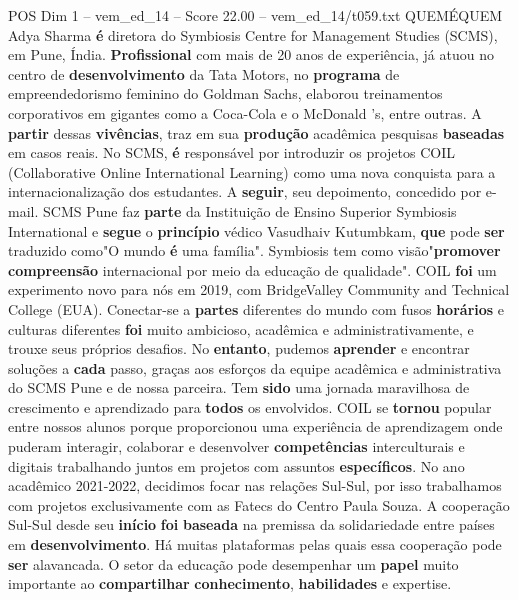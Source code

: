 \begin{textsample}{POS Dim 1 – vem\_ed\_14 – Score 22.00 – vem\_ed\_14/t059.txt}  \label{ex:f1_pos_152}
QUEMÉQUEM Adya Sharma \textbf{é} diretora do Symbiosis Centre for Management Studies (SCMS), em Pune, Índia. \textbf{Profissional} com mais de 20 anos de experiência, já atuou no centro de \textbf{desenvolvimento} da Tata Motors, no \textbf{programa} de empreendedorismo feminino do Goldman Sachs, elaborou treinamentos corporativos em gigantes como a Coca-Cola e o McDonald 's, entre outras.
A \textbf{partir} dessas \textbf{vivências}, traz em sua \textbf{produção} acadêmica pesquisas \textbf{baseadas} em casos reais.
No SCMS, \textbf{é} responsável por introduzir os projetos COIL (Collaborative Online International Learning) como uma nova conquista para a internacionalização dos estudantes.
A \textbf{seguir}, seu depoimento, concedido por e-mail.
SCMS Pune faz \textbf{parte} da Instituição de Ensino Superior Symbiosis International e \textbf{segue} o \textbf{princípio} védico Vasudhaiv Kutumbkam, \textbf{que} pode \textbf{ser} traduzido como"O mundo \textbf{é} uma família".
Symbiosis tem como visão"\textbf{promover} \textbf{compreensão} internacional por meio da educação de qualidade".
COIL \textbf{foi} um experimento novo para nós em 2019, com BridgeValley Community and Technical College (EUA).
Conectar-se a \textbf{partes} diferentes do mundo com fusos \textbf{horários} e culturas diferentes \textbf{foi} muito ambicioso, acadêmica e administrativamente, e trouxe seus próprios desafios.
No \textbf{entanto}, pudemos \textbf{aprender} e encontrar soluções a \textbf{cada} passo, graças aos esforços da equipe acadêmica e administrativa do SCMS Pune e de nossa parceira.
Tem \textbf{sido} uma jornada maravilhosa de crescimento e aprendizado para \textbf{todos} os envolvidos.
COIL se \textbf{tornou} popular entre nossos alunos porque proporcionou uma experiência de aprendizagem onde puderam interagir, colaborar e desenvolver \textbf{competências} interculturais e digitais trabalhando juntos em projetos com assuntos \textbf{específicos}.
No ano acadêmico 2021-2022, decidimos focar nas relações Sul-Sul, por isso trabalhamos com projetos exclusivamente com as Fatecs do Centro Paula Souza.
A cooperação Sul-Sul desde seu \textbf{início} \textbf{foi} \textbf{baseada} na premissa da solidariedade entre países em \textbf{desenvolvimento}.
Há muitas plataformas pelas quais essa cooperação pode \textbf{ser} alavancada.
O setor da educação pode desempenhar um \textbf{papel} muito importante ao \textbf{compartilhar} \textbf{conhecimento}, \textbf{habilidades} e expertise.

\end{textsample}
